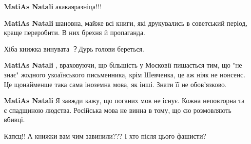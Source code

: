 \begin{itemize}
\textbf{MatiAs Natali} акакаяразніца!!!

 
\textbf{MatiAs Natali} шановна, майже всі книги, які друкувались в советський період, краще переробити. В них брехня й пропаганда.

 
Хіба книжка винувата ？Дурь голови береться.

 
\textbf{MatiAs Natali} , враховуючи, що більшість у Московії пишається тим, що "не знає" жодного укоаїнського письменника, крім Шевченка, це аж ніяк не нонсенс. Це щонайменше така сама іноземна мова, як інші. Знати її не обов'язково.

 
\textbf{MatiAs Natali} Я завжди кажу, що поганих мов не існує. Кожна неповторна та є спадщиною людства. Російська мова не винна в тому, що єю розмовляють вбивці.

\end{itemize}

 
Капєц!! А книжки вам чим завинили??? І хто після цього фашисти?


